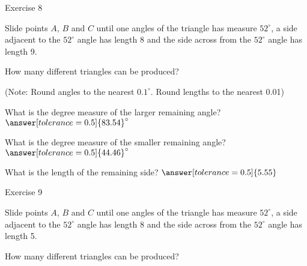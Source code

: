 \documentclass[number]{ximera}
\begin{document}
Exercise 8

Slide points $A$, $B$ and $C$ until one angles of the triangle has measure $52^\circ$, a side adjacent to the $52^\circ$ angle has length 8 and the side across from the $52^\circ$ angle has length 9.

\begin{question}
How many different triangles can be produced?
\begin{multipleChoice}
\end{multipleChoice}
\begin{question}
(Note: Round angles to the nearest $0.1^\circ$. Round lengths to the nearest 0.01)

What is the degree measure of the larger remaining angle? $\answer[tolerance=0.5]{83.54}^\circ$

What is the degree measure of the smaller remaining angle? $\answer[tolerance=0.5]{44.46}^\circ$

What is the length of the remaining side? $\answer[tolerance=0.5]{5.55}$

\end{question}
\end{question}

Exercise 9

Slide points $A$, $B$ and $C$ until one angles of the triangle has measure $52^\circ$, a side adjacent to the $52^\circ$ angle has length 8 and the side across from the $52^\circ$ angle has length 5.

\begin{question}
How many different triangles can be produced?
\begin{multipleChoice}
\end{multipleChoice}

\end{question}
\end{document}
